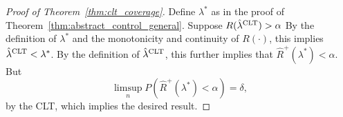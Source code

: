 \documentclass[10pt]{article}
\def\E{\mathbb{E}}
\newcommand{\T}{\mathcal{T}}
\newcommand{\lhat}{\hat{\lambda}}
\newcommand{\Rhat}{\widehat{R}}
\begin{document}
\begin{proof}[Proof of Theorem~\ref{thm:clt_coverage}]
Define $\lambda^*$ as in the proof of Theorem~\ref{thm:abstract_control_general}. 
Suppose $R(\lhat^{\textnormal{CLT}}) > \alpha$
By the definition of $\lambda^*$ and the monotonicity and continuity of $R(\cdot)$, this implies
$\lhat^{\textnormal{CLT}} < \lambda^*$. By the definition of $\lhat^{\textnormal{CLT}}$, this further implies that $\Rhat^+(\lambda^*) < \alpha$. But
\begin{equation*}
    \limsup_{n} P(\Rhat^+(\lambda^*) < \alpha) = \delta,
\end{equation*}
by the CLT, which implies the desired result.
\end{proof}

\end{document}
